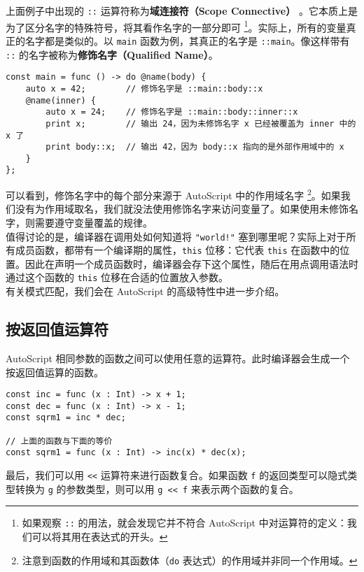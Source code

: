上面例子中出现的 \lstinline!::! 运算符称为\textbf{域连接符（Scope Connective）} 。它本质上是为了区分名字的特殊符号，将其看作名字的一部分即可 \footnote{如果观察 \lstinline!::! 的用法，就会发现它并不符合 AutoScript 中对运算符的定义：我们可以将其用在表达式的开头。}。实际上，所有的变量真正的名字都是类似的。以 \lstinline!main! 函数为例，其真正的名字是 \lstinline!::main!。像这样带有 \lstinline!::! 的名字被称为\textbf{修饰名字（Qualified Name）}。

\begin{lstlisting}
const main = func () -> do @name(body) {
    auto x = 42;        // 修饰名字是 ::main::body::x
    @name(inner) {
        auto x = 24;    // 修饰名字是 ::main::body::inner::x
        print x;        // 输出 24，因为未修饰名字 x 已经被覆盖为 inner 中的 x 了
        print body::x;  // 输出 42，因为 body::x 指向的是外部作用域中的 x
    }
};
\end{lstlisting}

可以看到，修饰名字中的每个部分来源于 AutoScript 中的作用域名字 \footnote{注意到函数的作用域和其函数体（\lstinline!do! 表达式）的作用域并非同一个作用域。}。如果我们没有为作用域取名，我们就没法使用修饰名字来访问变量了。如果使用未修饰名字，则需要遵守变量覆盖的规律。 \\

值得讨论的是，编译器在调用处如何知道将 \lstinline|"world!"| 塞到哪里呢？实际上对于所有成员函数，都带有一个编译期的属性，\lstinline!this! 位移：它代表 \lstinline!this! 在函数中的位置。因此在声明一个成员函数时，编译器会存下这个属性，随后在用点调用语法时通过这个函数的 \lstinline!this! 位移在合适的位置放入参数。 \\

有关模式匹配，我们会在 AutoScript 的高级特性中进一步介绍。

\subsection{按返回值运算符}

AutoScript 相同参数的函数之间可以使用任意的运算符。此时编译器会生成一个按返回值运算的函数。

\begin{lstlisting}
const inc = func (x : Int) -> x + 1;
const dec = func (x : Int) -> x - 1;
const sqrm1 = inc * dec;

// 上面的函数与下面的等价
const sqrm1 = func (x : Int) -> inc(x) * dec(x);
\end{lstlisting}

最后，我们可以用 \lstinline!<<! 运算符来进行函数复合。如果函数 \lstinline!f! 的返回类型可以隐式类型转换为 \lstinline!g! 的参数类型，则可以用 \lstinline!g << f! 来表示两个函数的复合。

